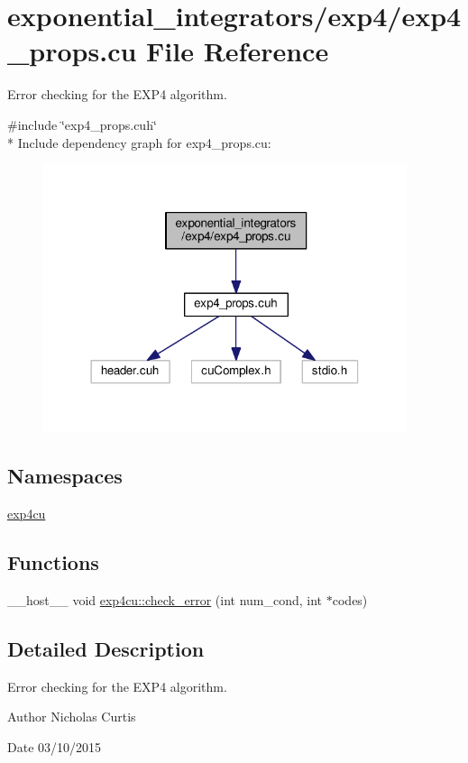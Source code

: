 \hypertarget{exp4__props_8cu}{}\section{exponential\+\_\+integrators/exp4/exp4\+\_\+props.cu File Reference}
\label{exp4__props_8cu}


Error checking for the E\+X\+P4 algorithm.  


{\ttfamily \#include \char`\"{}exp4\+\_\+props.\+cuh\char`\"{}}\\*
Include dependency graph for exp4\+\_\+props.\+cu\+:\nopagebreak
\begin{figure}[H]
\begin{center}
\leavevmode
\includegraphics[width=302pt]{exp4__props_8cu__incl}
\end{center}
\end{figure}
\subsection*{Namespaces}
\begin{DoxyCompactItemize}
\item 
 \hyperlink{namespaceexp4cu}{exp4cu}
\end{DoxyCompactItemize}
\subsection*{Functions}
\begin{DoxyCompactItemize}
\item 
\+\_\+\+\_\+host\+\_\+\+\_\+ void \hyperlink{namespaceexp4cu_a2d5234f5e9971aec336ac64ce719f1f4}{exp4cu\+::check\+\_\+error} (int num\+\_\+cond, int $\ast$codes)
\end{DoxyCompactItemize}


\subsection{Detailed Description}
Error checking for the E\+X\+P4 algorithm. 

\begin{DoxyAuthor}{Author}
Nicholas Curtis 
\end{DoxyAuthor}
\begin{DoxyDate}{Date}
03/10/2015 
\end{DoxyDate}
